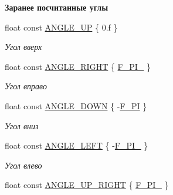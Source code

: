 \begin{Indent}\textbf{ Заранее посчитанные углы}\par
\begin{DoxyCompactItemize}
\item 
\mbox{\label{namespacertm_a2755f61661c6017691ba77b93ef499e6}} 
float const \hyperlink{namespacertm_a2755f61661c6017691ba77b93ef499e6}{A\+N\+G\+L\+E\+\_\+\+UP} \{ 0.f \}
\begin{DoxyCompactList}\small\item\em Угол вверх \end{DoxyCompactList}\item 
\mbox{\label{namespacertm_a39212dd73aa5a6387211cf776bdb64d8}} 
float const \hyperlink{namespacertm_a39212dd73aa5a6387211cf776bdb64d8}{A\+N\+G\+L\+E\+\_\+\+R\+I\+G\+HT} \{ \hyperlink{namespacertm_ae9fd4cc21cfc9e2331c1a9c3370aea30}{F\+\_\+\+P\+I\+\_} \}
\begin{DoxyCompactList}\small\item\em Угол вправо \end{DoxyCompactList}\item 
\mbox{\label{namespacertm_a5a3672b45c2bfd3499c130529cacb724}} 
float const \hyperlink{namespacertm_a5a3672b45c2bfd3499c130529cacb724}{A\+N\+G\+L\+E\+\_\+\+D\+O\+WN} \{ -\/\hyperlink{namespacertm_ae15880ada663d5427ba0d78437ee5c26}{F\+\_\+\+PI} \}
\begin{DoxyCompactList}\small\item\em Угол вниз \end{DoxyCompactList}\item 
\mbox{\label{namespacertm_a95c681ed5808f0a9b59770fb9bb20ece}} 
float const \hyperlink{namespacertm_a95c681ed5808f0a9b59770fb9bb20ece}{A\+N\+G\+L\+E\+\_\+\+L\+E\+FT} \{ -\/\hyperlink{namespacertm_ae9fd4cc21cfc9e2331c1a9c3370aea30}{F\+\_\+\+P\+I\+\_} \}
\begin{DoxyCompactList}\small\item\em Угол влево \end{DoxyCompactList}\item 
\mbox{\label{namespacertm_a68b99102779f6297a0de7656207f048a}} 
float const \hyperlink{namespacertm_a68b99102779f6297a0de7656207f048a}{A\+N\+G\+L\+E\+\_\+\+U\+P\+\_\+\+R\+I\+G\+HT} \{ \hyperlink{namespacertm_a5d5e98851be43c6884812bf293b09184}{F\+\_\+\+P\+I\+\_} \}

\end{DoxyCompactItemize}
\end{Indent}
